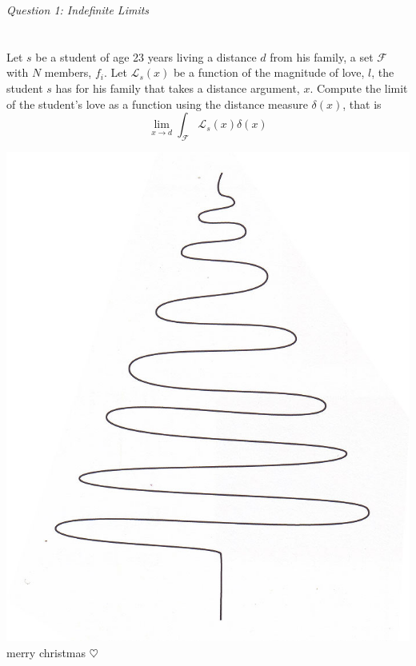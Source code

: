 \documentclass[12 pt]{article}
\begin{document}
\begin{frontcover}
%
\textit{Question 1: Indefinite Limits} \\ 
%
\\~\\
Let $s$ be a student of age 23 years living a distance $d$ from his family, a set $\mathcal{F}$ with $N$ members, $f_i$. Let $\mathcal{L}_s(x)$ be a function of the magnitude of love, $l$, the student $s$ has for his family that takes a distance argument, $x$.  Compute the limit of the student's love as a function using the distance measure $\delta(x)$, that is 
%
\begin{equation*}
\lim_{x\to{d}}\int_{\mathcal{F}}{\mathcal{L}_s(x)\delta(x)} 
\end{equation*}
%
\end{frontcover}
%
\begin{backcover}
\includegraphics[width=\panelwidth]{tree.jpg}
\centering
\Large{merry christmas} $\heartsuit$
\end{backcover}
%
\end{document}
